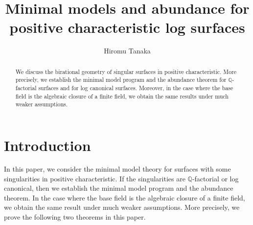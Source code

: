 \documentclass[12pt,twoside]{amsart}
\title[MINIMAL MODELS AND ABUNDANCE]
{Minimal models and abundance for positive characteristic log surfaces}
\author{Hiromu Tanaka}
\theoremstyle{definition}
\newcommand{\Q}{$\mathbb{Q}$}
\begin{document}
\maketitle




\begin{abstract}
We discuss the birational geometry of singular surfaces 
in positive characteristic. 
More precisely, we establish 
the minimal model program and the abundance theorem 
for \Q-factorial surfaces and 
for log canonical surfaces. 
Moreover, 
in the case where the base field is the algebraic closure of a finite field, 
we obtain the same results under much weaker assumptions. 
\end{abstract}


\tableofcontents





\section{Introduction}

In this paper, 
we consider the minimal model theory 
for surfaces with some singularities in positive characteristic. 
If the singularities are \Q-factorial or log canonical, then 
we establish the minimal model program and the abundance theorem. 
In the case where the base field is the algebraic closure of a finite field, 
we obtain the same result under much weaker assumptions. 
More precisely, we prove the following two theorems in this paper. 
\end{document}
